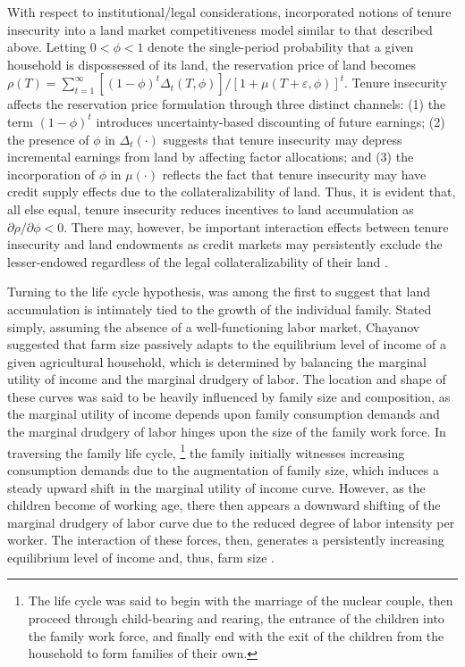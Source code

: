\documentclass[english]{article}
\begin{document}
With respect to institutional/legal considerations, \citet{carter1998b} 
incorporated notions of tenure insecurity into a land market competitiveness 
model similar to that described above.
Letting $0 < \phi < 1$ denote the single-period probability that a given 
household is dispossessed of its land, the reservation price of land becomes 
$\rho(T) = \sum_{t=1}^{\infty} [(1 - \phi)^t \Delta_t(T, \phi)]/
[1 + \mu(T + \varepsilon, \phi)]^t$.
Tenure insecurity affects the reservation price formulation through three distinct
channels: (1) the term $(1 - \phi)^t$ introduces uncertainty-based discounting 
of future earnings; (2) the presence of $\phi$ in $\Delta_t(\cdot)$ suggests 
that tenure insecurity may depress incremental earnings from land by affecting 
factor allocations; and (3) the incorporation of $\phi$ in $\mu(\cdot)$ reflects 
the fact that tenure insecurity may have credit supply effects due to the 
collateralizability of land.
Thus, it is evident that, all else equal, tenure insecurity reduces incentives to 
land accumulation as $\partial \rho / \partial \phi < 0$.
There may, however, be important interaction effects between tenure insecurity
and land endowments as credit markets may persistently exclude the 
lesser-endowed regardless of the legal collateralizability of their land 
\citep{carter1988}.

Turning to the life cycle hypothesis, \citet{chayanov1966} was among the first 
to suggest that land accumulation is intimately tied to the growth of the 
individual family. 
Stated simply, assuming the absence of a well-functioning labor market, 
Chayanov suggested that farm size passively adapts to the equilibrium level of 
income of a given agricultural household, which is determined by balancing 
the marginal utility of income and the marginal drudgery of labor. 
The location and shape of these curves was said to be heavily influenced by 
family size and composition, as the marginal utility of income depends upon 
family consumption demands and the marginal drudgery of labor hinges upon 
the size of the family work force. 
In traversing the family life cycle,%
\footnote{The life cycle was said to begin with the marriage of the nuclear 
couple, then proceed through child-bearing and rearing, the entrance of the 
children into the family work force, and finally end with the exit of the children 
from the household to form families of their own.} 
the family initially witnesses increasing consumption demands due to the 
augmentation of family size, which induces a steady upward shift in the 
marginal utility of income curve. 
However, as the children become of working age, there then appears a 
downward shifting of the marginal drudgery of labor curve due to the reduced 
degree of labor intensity per worker. 
The interaction of these forces, then, generates a persistently increasing 
equilibrium level of income and, thus, farm size 
\citep{harrison1975, banaji1976}. 
\end{document}
